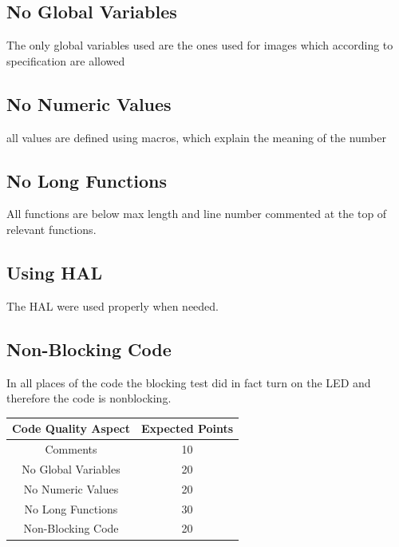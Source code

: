 \documentclass{article}
\begin{document}
\subsection{No Global Variables}
\begin{center}
    The only global variables used are the ones used for images which according to specification are allowed
\end{center}
\subsection{No Numeric Values}
\begin{center}
    all values are defined using macros, which explain the meaning of the number
\end{center}
\subsection{No Long Functions}
\begin{center}
    All functions are below max length and line number commented at the top of relevant functions.
\end{center}
\subsection{Using HAL} 
\begin{center}
    The HAL were used properly when needed.
\end{center}
\subsection{Non-Blocking Code}
\begin{center}
    In all places of the code the blocking test did in fact turn on the LED and therefore the code is nonblocking.
\end{center}
\begin{center}
    \begin{tabular}{c|c}
         Code Quality Aspect &  Expected Points\\
         \hline
         Comments & 10\\
         No Global Variables & 20\\
         No Numeric Values & 20\\
         No Long Functions & 30\\
         Non-Blocking Code & 20\\
    \end{tabular}
\end{center}
\end{document}

